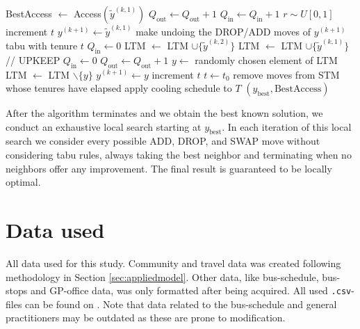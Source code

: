 \begin{algorithmic}[1]
    \State BestAccess $\gets$ Access$(\tilde y^{(k,1)})$
    \EndIf
    \Else%
    \State $Q_{\text{out}} \gets Q_{\text{out}} +1$ 
    \State $Q_{\text{in}} \gets Q_{\text{in}} +1$
    \State $r \sim U[0,1]$
    \State increment $t$ 
    \State $y^{(k+1)} \gets \tilde y^{(k,1)}$ 
    \State make undoing the DROP/ADD moves of $y^{(k+1)}$ tabu with tenure $t$
    \State $Q_{\text{in}} \gets 0$
    \State LTM $\gets$ LTM $\cup\{\tilde y^{(k,2)}\}$ 
    \Else
    \State LTM $\gets$ LTM $\cup\{\tilde y^{(k,1)}\}$ 
    \EndIf
    \EndIf
    \State // UPKEEP %
    \State $Q_{\text{in}} \gets 0$
    \State $Q_{\text{out}} \gets Q_{\text{out}} +1$
    \State $y\gets $ randomly chosen element of LTM
    \State LTM $\gets$ LTM $ \backslash \{y\}$
    \State $y^{(k+1)} \gets y$
    \State increment $t$
    \EndIf
    \State $t\gets t_0$
    \EndIf
    \State remove moves from STM whose tenures have elapsed
    \State apply cooling schedule to $T$
    \EndFor
    \State \Return $(y_\text{best}, \text{BestAccess})$
\end{algorithmic}

After the algorithm terminates and we obtain the best known solution, we conduct an exhaustive local search starting at $y_\text{best}$. In each iteration of this local search we consider every possible ADD, DROP, and SWAP move without considering tabu rules, always taking the best neighbor and terminating when no neighbors offer any improvement. The final result is guaranteed to be locally optimal.

\chapter{Data used}\label{app:data}
All data used for this study. Community and travel data was created following methodology in Section \ref{sec:appliedmodel}. Other data, like bus-schedule, bus-stops and GP-office data, was only formatted after being acquired. All used \texttt{.csv}-files can be found on \cite{dataHub}. Note that data related to the bus-schedule and general practitioners may be outdated as these are prone to modification.

